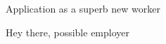 
\opening{		
	\large{Application as a superb new worker} \normalsize 
}

\makelettertitle\justifying

Hey there, possible employer
